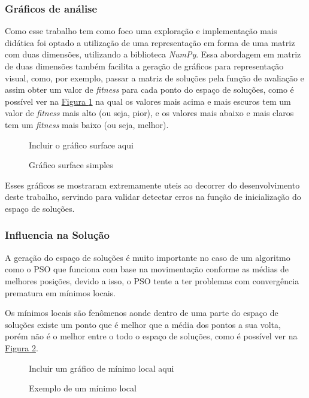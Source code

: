         \subsubsection{Gráficos de análise}
            Como esse trabalho tem como foco uma exploração e implementação mais didática foi optado a utilização de uma representação em forma de uma matriz com duas dimensões, utilizando a biblioteca \textit{NumPy}. Essa abordagem em matriz de duas dimensões também facilita a geração de gráficos para representação visual, como, por exemplo, passar a matriz de soluções pela função de avaliação e assim obter um valor de \textit{fitness} para cada ponto do espaço de soluções, como é possível ver na 
            \hyperref[fig:surfaceplot]{Figura \ref{fig:surfaceplot}} 
            na qual os valores mais acima e mais escuros tem um valor de \textit{fitness} mais alto (ou seja, pior), e os valores mais abaixo e mais claros tem um \textit{fitness} mais baixo (ou seja, melhor).\newline

            \begin{figure}[h]
                \centering
                \small{Incluir o gráfico surface aqui}
                \caption{Gráfico surface simples}
                \label{fig:surfaceplot}
            \end{figure}

            Esses gráficos se mostraram extremamente uteis ao decorrer do desenvolvimento deste trabalho, servindo para validar detectar erros na função de inicialização do espaço de soluções.\newline


        \subsubsection{Influencia na Solução}
            A geração do espaço de soluções é muito importante no caso de um algoritmo como o PSO 
            que funciona com base na movimentação conforme as médias de melhores posições, 
            devido a isso, o PSO tente a ter problemas com convergência prematura em mínimos locais.\newline
            
            Os mínimos locais são fenômenos aonde dentro de uma parte do espaço de soluções existe um ponto que é melhor que a média dos pontos a sua volta, porém não é o melhor entre o todo o espaço de soluções, como é possível ver na \hyperref[fig:ex-minimolocal]{Figura \ref{fig:ex-minimolocal}}.\newline
            \begin{figure}[h]
                \centering
                \small{Incluir um gráfico de mínimo local aqui}
                \caption{Exemplo de um mínimo local}
                \label{fig:ex-minimolocal}
            \end{figure}
            

